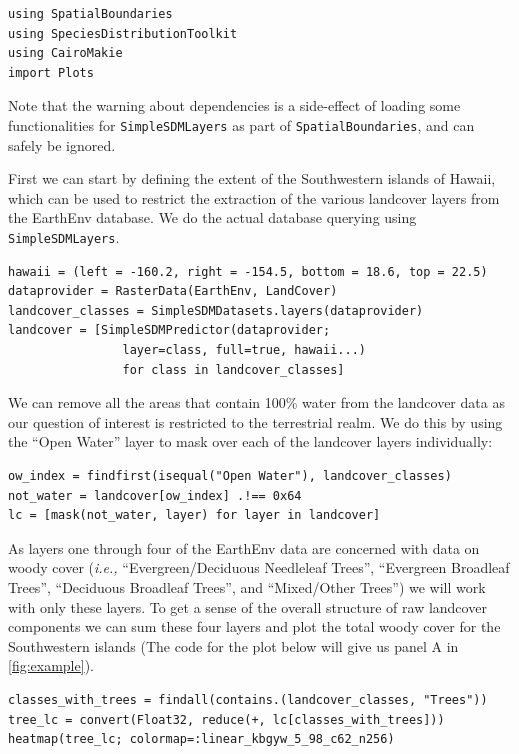 \begin{verbatim}
using SpatialBoundaries
using SpeciesDistributionToolkit
using CairoMakie
import Plots
\end{verbatim}

Note that the warning about dependencies is a side-effect of loading
some functionalities for \texttt{SimpleSDMLayers} as part of
\texttt{SpatialBoundaries}, and can safely be ignored.

First we can start by defining the extent of the Southwestern islands of
Hawaii, which can be used to restrict the extraction of the various
landcover layers from the EarthEnv database. We do the actual database
querying using \texttt{SimpleSDMLayers}.

\begin{verbatim}
hawaii = (left = -160.2, right = -154.5, bottom = 18.6, top = 22.5)
dataprovider = RasterData(EarthEnv, LandCover)
landcover_classes = SimpleSDMDatasets.layers(dataprovider)
landcover = [SimpleSDMPredictor(dataprovider; 
                layer=class, full=true, hawaii...) 
                for class in landcover_classes]
\end{verbatim}

We can remove all the areas that contain 100\% water from the landcover
data as our question of interest is restricted to the terrestrial realm.
We do this by using the ``Open Water'' layer to mask over each of the
landcover layers individually:

\begin{verbatim}
ow_index = findfirst(isequal("Open Water"), landcover_classes)
not_water = landcover[ow_index] .!== 0x64
lc = [mask(not_water, layer) for layer in landcover]
\end{verbatim}

As layers one through four of the EarthEnv data are concerned with data
on woody cover (\emph{i.e.,} ``Evergreen/Deciduous Needleleaf Trees'',
``Evergreen Broadleaf Trees'', ``Deciduous Broadleaf Trees'', and
``Mixed/Other Trees'') we will work with only these layers. To get a
sense of the overall structure of raw landcover components we can sum
these four layers and plot the total woody cover for the Southwestern
islands (The code for the plot below will give us panel A in
\autoref{fig:example}).

\begin{verbatim}
classes_with_trees = findall(contains.(landcover_classes, "Trees"))
tree_lc = convert(Float32, reduce(+, lc[classes_with_trees]))
heatmap(tree_lc; colormap=:linear_kbgyw_5_98_c62_n256)
\end{verbatim}

